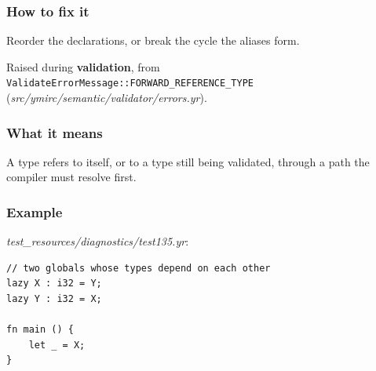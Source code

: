 \subsubsection*{How to fix it}

Reorder the declarations, or break the cycle the aliases form.

\label{sec:codes:e4069}

Raised during \textbf{validation}, from \texttt{ValidateErrorMessage::\allowbreak{}FORWARD\_\allowbreak{}REFERENCE\_\allowbreak{}TYPE} (\textit{src/\allowbreak{}ymirc/\allowbreak{}semantic/\allowbreak{}validator/\allowbreak{}errors.yr}).

\subsubsection*{What it means}

A type refers to itself, or to a type still being validated, through a path the compiler must resolve first.

\subsubsection*{Example}

\textit{test\_\allowbreak{}resources/\allowbreak{}diagnostics/\allowbreak{}test135.yr}:

\begin{lstlisting}[style=coloredverbatimError]
// two globals whose types depend on each other
lazy X : i32 = Y;
lazy Y : i32 = X;

fn main () {
    let _ = X;
}
\end{lstlisting}

